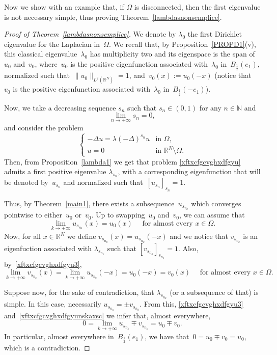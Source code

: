 \documentclass[12pt,a4paper,intlimits,sumlimits]{amsart}
\def \N {\mathbb{N}}
\def \R {\mathbb{R}}
\theoremstyle{definition}
\theoremstyle{plain}
\numberwithin{equation}{section}
\begin{document}
Now we show with an example that, if $\Omega$ is disconnected, then the first eigenvalue is not necessary simple, thus proving Theorem~\ref{lambdasnonsemplice}.

\begin{proof}[Proof of Theorem~\ref{lambdasnonsemplice}]
We denote by $\lambda_0$ the first Dirichlet eigenvalue for the Laplacian in~$ \Omega$. We recall that,
by Proposition~\ref{PROPD1}(v), this classical eigenvalue~$\lambda_0$ has multiplicity two and its eigenspace is the span of~$u_0$ and~$v_0$, where~$u_0$ is the positive eigenfunction associated with~$\lambda_0$ in~$B_{\frac12}(e_1)$, normalized such that~$\|u_0\|_{L^2(\R^N)}=1$,
and~$v_0(x):=u_0(-x)$ (notice that~$v_0$ is the positive eigenfunction associated with~$\lambda_0$ in~$B_{\frac12}(-e_1)$).

Now, we take a decreasing sequence $s_n$ such that $s_n\in (0,1)$ for any $n\in \N$ and
\[
\lim_{n\to +\infty}s_n=0,
\]
and consider the problem 
\begin{equation}\label{xftxcfgcvghxdfgyu}
\begin{cases}
-\Delta u=\lambda (-\Delta)^{s_n} u &\mbox{in }\Omega,
\\
u=0  &\mbox{in }\R^N\setminus \Omega.
\end{cases}
\end{equation}
Then, from Proposition~\ref{lambda1} we get that problem \eqref{xftxcfgcvghxdfgyu} admits a first positive eigenvalue $\lambda_{s_n}$, with a
corresponding eigenfunction that will be denoted by~$u_{s_{n}}$
and normalized such that~$[u_{s_{n}}]_{s_{n}}=1$.

Thus, by Theorem~\ref{main1}, there exists a subsequence~$u_{s_{n_k}}$ which converges pointwise to either~$u_0$ or~$v_0$.
Up to swapping~$u_0$ and~$v_0$, we can assume that
\begin{equation}\label{xftxcfgcvghxdfgyu3}
\lim_{k\to +\infty}u_{s_{n_k}}(x)=u_0(x)\quad \mbox{ for almost every }x\in \Omega.
\end{equation}
Now, for all $x\in \R^N$ we define $v_{s_{n_k}}(x)=u_{s_{n_k}}(-x)$ and we notice that $v_{s_{n_k}}$ is an eigenfuction associated with $\lambda_{s_{n_k}}$ such that $[v_{s_{n_k}}]_{s_{n_k}}=1$. Also, by~\eqref{xftxcfgcvghxdfgyu3},
\begin{equation}\label{xftxcfgcvghxdfgyunskaxsc}\lim_{k\to +\infty}v_{s_{n_k}}(x)=
\lim_{k\to +\infty}u_{s_{n_k}}(-x)=u_0(-x)=v_0(x)\quad \mbox{ for almost every }x\in \Omega.
\end{equation}

Suppose now, for the sake of contradiction, that $\lambda_{s_{n_k}}$ (or a subsequence of that) is simple. In this case, necessarily $u_{s_{n_k}}=\pm v_{s_{n_k}}$. From this, \eqref{xftxcfgcvghxdfgyu3} and~\eqref{xftxcfgcvghxdfgyunskaxsc} we infer that, almost everywhere,
$$ 0=\lim_{k\to +\infty}u_{s_{n_k}}\mp v_{s_{n_k}}=u_0\mp v_0.
$$
In particular, almost everywhere in~$ B_\frac{1}{2}(e_1)$, we have that~$0=u_0\mp v_0=u_0$,
which is a contradiction.
\end{proof}
\end{document}
